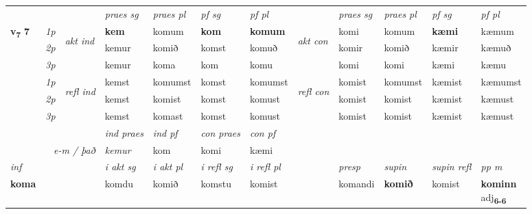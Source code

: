 \begin{longtable}[l]{X>{\footnotesize\itshape}llXXXXlXXXX}
 & &   & \textit{praes sg}  & \textit{praes pl}    & \textit{ pf sg} & \textit{pf pl} & & \textit{praes sg}  & \textit{praes pl}    & \textit{pf sg} & \textit{pf pl }  \\ \cmidrule{4-7} \cmidrule{9-12}
 \multirow{2}{*}{{{\textbf{v{\textsubscript{7}}} \Large{\textbf{7}}}}}  & 1p & \multirow{3}{*}{\begin{turn}{90}\textit{akt ind}\end{turn}} & \textbf{kem} & komum & \textbf{kom} & \textbf{komum} & \multirow{3}{*}{\begin{turn}{90}\textit{akt con}\end{turn}} &komi & komum & \textbf{kæmi} & kæmum\\*
 & 2p &  &  kemur  & komið & komst & komuð & & komir & komið & kæmir & kæmuð \\*
 & 3p &  & kemur & koma & kom & komu & & komi & komi& kæmi & kæmu \\*
\cmidrule{4-7} \cmidrule{9-12}
 & 1p & \multirow{3}{*}{\begin{turn}{90}\textit{refl ind}\end{turn}}  & kemst & komumst & komst & komumst & \multirow{3}{*}{\begin{turn}{90}\textit{refl con}\end{turn}}  &komist & komumst & kæmist & kæmumst \\*
 & 2p &  & kemst & komist & komst & komust & &komist & komist & kæmist & kæmust \\*
 & 3p  & & kemst & komast & komst & komust & & komist & komist& kæmist & kæmust \\*
\cmidrule{4-7} \cmidrule{9-12}

   && &  \textit{ind praes} & \textit{ind pf} & \textit{con praes} & \textit{con pf} \\*
\multicolumn{3}{r}{\textit{e-m / það}} & kemur & kom & komi & kæmi \\*

\cmidrule{4-7}
   {\textit{inf}} & &  & \textit{i akt sg} & \textit{i akt pl} & \textit{i refl sg} & \textit{i refl pl} && \textit{presp} & \textit{supin} & \textit{supin refl} & \textit{pp m} \\*
  {\textbf{koma}} & && komdu  & komið & komstu & komist && komandi &  \textbf{komið} & komist & \specialcell{\textbf{kominn} \\ adj\textbf{\textsubscript{6-6}}} \\*

\midrule


\end{longtable}
